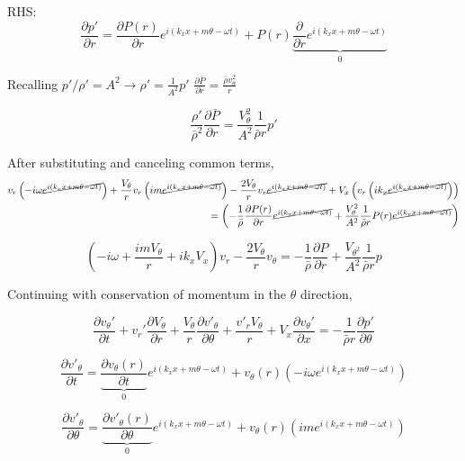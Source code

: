 \documentclass[12pt]{article}
\begin{document}
RHS:
\[\frac{\partial p'}{\partial r} = \frac{\partial P(r)}{\partial r} e^{i\left(k_x x + m \theta - \omega t \right)} + P(r)\underbrace{\frac{\partial}{\partial  r} e^{i\left(k_x x + m \theta - \omega t \right)}}_0 \]

Recalling $ p'/\rho' = A^2 \rightarrow \rho' = \frac{1}{A^2}p' $ $ \frac{\partial \bar{P}}{\partial r} = \frac{\bar{\rho} v_{\theta}^2}{r} $

\[\frac{\rho ' }{\bar{\rho}^2} \frac{ \partial \bar{P}}{\partial r} = \frac{V_{\theta}^2}{A^2}\frac{1}{\bar{\rho} r}p'\]


After substituting and canceling common terms,
\begin{align*}
 v_r \left(-i\omega \cancel{e^{i\left(k_x x + m \theta - \omega t \right)}}\right)+
\frac{V_{\theta}}{r} v_r \left(im \cancel{e^{i\left(k_x x + m \theta - \omega t \right)}}\right) -
\frac{2V_{\theta}}{r}v_r  \cancel{e^{i\left(k_x x + m \theta - \omega t \right)}} + V_x \left(v_r \left(ik_x \cancel{e^{i\left(k_x x + m \theta - \omega t \right)}}\right)\right) \\
=   \left(-\frac{1}{\bar{\rho}} \frac{\partial P(r)}{\partial r}\cancel{e^{i\left(k_x x + m \theta - \omega t \right)} } +  \frac{V_{\theta}^2}{A^2}\frac{1}{\bar{\rho} r} P(r)\cancel{e^{i\left(k_x x + m \theta - \omega t \right)} }\right) 
\end{align*}

\[\left(-i\omega + \frac{i m V_{\theta}}{r} + i k_x V_x \right) v_r - \frac{2 V_{\theta}}{r}v_{\theta}  = -\frac{1}{\bar{\rho}} \frac{\partial P}{\partial r}+ \frac{V_{\theta^2}}{A^2}\frac{1}{\bar{\rho} r}p\]

Continuing with conservation of momentum in the $\theta$ direction,

\[\frac{\partial  v_{\theta}' }{\partial t} +
v_r' \frac{\partial  V_{\theta}  }{\partial r} +
\frac{V_{\theta}}{r} \frac{\partial v'_{\theta}}{\partial \theta} +
\frac{v'_rV_{\theta}}{r} +
V_x \frac{\partial v_{\theta}'}{\partial x} 
= -\frac{1}{\bar{\rho} r}	\frac{\partial p'}{\partial \theta}\]

\[\frac{\partial v'_{\theta}}{\partial t} = 
\underbrace{\frac{\partial v_{\theta}(r)}{\partial t}}_{0} e^{i\left(k_x x + m \theta - \omega t \right)} + 
v_{\theta}(r) \left(-i\omega e^{i\left(k_x x + m \theta - \omega t \right)}\right)\]

\[\frac{\partial v'_{\theta}}{\partial \theta} = \underbrace{\frac{\partial v'_{\theta}(r)}{\partial \theta}}_{0} e^{i\left(k_x x + m \theta - \omega t \right)} + v_{\theta}(r) \left(im e^{i\left(k_x x + m \theta - \omega t \right)}\right)\]
\end{document}
